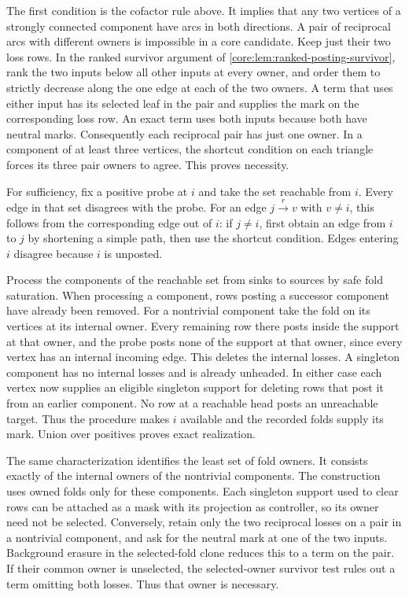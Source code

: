 The first condition is the cofactor rule above.
It implies that any two vertices of a strongly
connected component have arcs in both directions.
A pair of reciprocal arcs with different owners
is impossible in a core candidate. Keep just their
two loss rows. In the ranked survivor argument of
\cref{core:lem:ranked-posting-survivor}, rank the two
inputs below all other inputs at every owner, and
order them to strictly decrease along the one edge
at each of the two owners. A term that uses either
input has its selected leaf in the pair and supplies
the mark on the corresponding loss row. An exact
term uses both inputs because both have neutral
marks. Consequently each reciprocal pair has just
one owner. In a component of at least three vertices,
the shortcut condition on each triangle forces its
three pair owners to agree. This proves necessity.

For sufficiency, fix a positive probe at $i$ and take
the set reachable from $i$. Every edge in that set
disagrees with the probe. For an edge $j\xrightarrow{r}v$
with $v\ne i$, this follows from the corresponding
edge out of $i$: if $j\ne i$, first obtain an edge
from $i$ to $j$ by shortening a simple path, then
use the shortcut condition. Edges entering $i$
disagree because $i$ is unposted.

Process the components of the reachable set from
sinks to sources by safe fold saturation. When
processing a component, rows posting a successor
component have already been removed. For a
nontrivial component take the fold on its vertices
at its internal owner. Every remaining row there
posts inside the support at that owner, and the
probe posts none of the support at that owner,
since every vertex has an internal incoming edge.
This deletes the internal losses. A singleton
component has no internal losses and is already
unheaded. In either case each vertex now supplies
an eligible singleton support for deleting rows
that post it from an earlier component. No row
at a reachable head posts an unreachable target.
Thus the procedure makes $i$ available and the
recorded folds supply its mark. Union over positives
proves exact realization.

The same characterization identifies the least set
of fold owners. It consists exactly of the internal
owners of the nontrivial components. The construction
uses owned folds only for these components. Each
singleton support used to clear rows can be attached
as a mask with its projection as controller, so its
owner need not be selected. Conversely, retain only
the two reciprocal losses on a pair in a nontrivial
component, and ask for the neutral mark at one of
the two inputs. Background erasure in the selected-fold
clone reduces this to a term on the pair. If their
common owner is unselected, the selected-owner
survivor test rules out a term omitting both losses.
Thus that owner is necessary.

